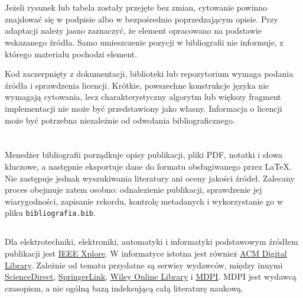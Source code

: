 \section{}

Jeżeli rysunek lub tabela zostały przejęte bez zmian, cytowanie powinno znajdować się w podpisie albo w bezpośrednio poprzedzającym opisie. Przy adaptacji należy jasno zaznaczyć, że element opracowano na podstawie wskazanego źródła. Samo umieszczenie pozycji w bibliografii nie informuje, z którego materiału pochodzi element.

Kod zaczerpnięty z dokumentacji, biblioteki lub repozytorium wymaga podania źródła i sprawdzenia licencji. Krótkie, powszechne konstrukcje języka nie wymagają cytowania, lecz charakterystyczny algorytm lub większy fragment implementacji nie może być przedstawiony jako własny. Informacja o licencji może być potrzebna niezależnie od odwołania bibliograficznego.

\section{}

Menedżer bibliografii porządkuje opisy publikacji, pliki PDF, notatki i słowa kluczowe, a następnie eksportuje dane do formatu obsługiwanego przez LaTeX. Nie zastępuje jednak wyszukiwania literatury ani oceny jakości źródeł. Zalecany proces obejmuje zatem osobno: odnalezienie publikacji, sprawdzenie jej wiarygodności, zapisanie rekordu, kontrolę metadanych i wykorzystanie go w pliku \texttt{bibliografia.bib}.

\subsection{}

Dla elektrotechniki, elektroniki, automatyki i informatyki podstawowym źródłem publikacji jest \href{https://ieeexplore.ieee.org/}{IEEE Xplore}. W informatyce istotna jest również \href{https://dl.acm.org/}{ACM Digital Library}. Zależnie od tematu przydatne są serwisy wydawców, między innymi \href{https://www.sciencedirect.com/}{ScienceDirect}, \href{https://link.springer.com/}{SpringerLink}, \href{https://onlinelibrary.wiley.com/}{Wiley Online Library} i \href{https://www.mdpi.com/}{MDPI}. MDPI jest wydawcą czasopism, a nie ogólną bazą indeksującą całą literaturę naukową.


